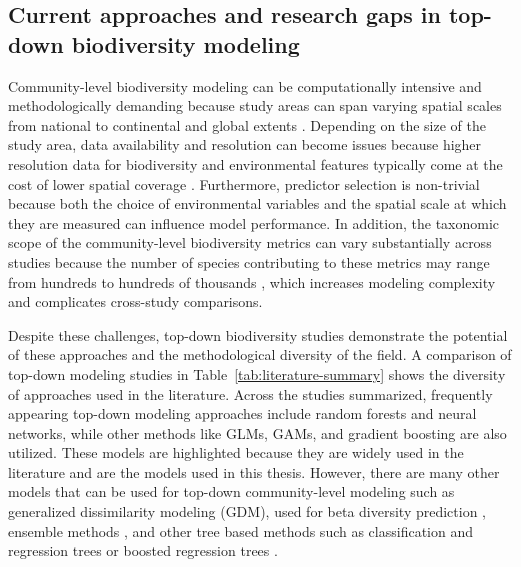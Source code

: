 \subsection{Current approaches and research gaps in top-down biodiversity modeling}\label{subsec:current-approaches}
Community-level biodiversity modeling can be computationally intensive and methodologically demanding because study areas can span varying spatial scales from national to continental and global extents \parencite{baggstrom2025, davis2023, hoskins2020}. Depending on the size of the study area, data availability and resolution can become issues because higher resolution data for biodiversity and environmental features typically come at the cost of lower spatial coverage \parencite{wuest2020}. Furthermore, predictor selection is non-trivial because both the choice of environmental variables \parencite{williams2012} and the spatial scale at which they are measured \parencite{mertes2018scale} can influence model performance. In addition, the taxonomic scope of the community-level biodiversity metrics can vary substantially across studies because the number of species contributing to these metrics may range from hundreds \parencite{andermann2022} to hundreds of thousands \parencite{hoskins2020}, which increases modeling complexity and complicates cross-study comparisons. 

Despite these challenges, top-down biodiversity studies demonstrate the potential of these approaches and the methodological diversity of the field. A comparison of top-down modeling studies in Table~\ref{tab:literature-summary} shows the diversity of approaches used in the literature. Across the studies summarized, frequently appearing top-down modeling approaches include random forests and neural networks, while other methods like GLMs, GAMs, and gradient boosting are also utilized. These models are highlighted because they are widely used in the literature and are the models used in this thesis. However, there are many other models that can be used for top-down community-level modeling such as generalized dissimilarity modeling (GDM), used for beta diversity prediction \parencite{hoskins2020}, ensemble methods \parencite{ngor2023}, and other tree based methods such as classification and regression trees or boosted regression trees \parencite{distler2015, ngor2023}. 


